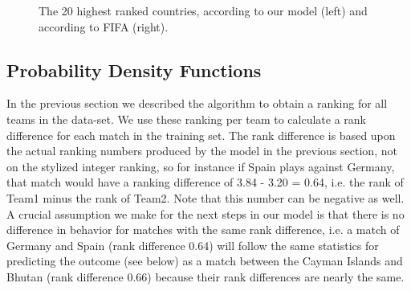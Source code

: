 \documentclass{llncs}
\begin{document}
\begin{figure}
  \centering
  \caption{The 20 highest ranked countries, according to our model (left) and according to FIFA (right).}
  \label{fig:rank}
\end{figure}

\subsection{Probability Density Functions}

In the previous section we described the algorithm to obtain a ranking for all teams in the data-set. We use these ranking per team to calculate a rank difference for each match in the training set. The rank difference is based upon the actual ranking numbers produced by the model in the previous section, not on the stylized integer ranking, so for instance if Spain plays against Germany, that match would have a ranking difference of 3.84 - 3.20 = 0.64, i.e. the rank of Team1 minus the rank of Team2. Note that this number can be negative as well. A crucial assumption we make for the next steps in our model is that there is no difference in behavior for matches with the same rank difference, i.e. a match of Germany and Spain (rank difference 0.64) will follow the same statistics for predicting the outcome (see below) as a match between the Cayman Islands and Bhutan (rank difference 0.66) because their rank differences are nearly the same.
\end{document}
